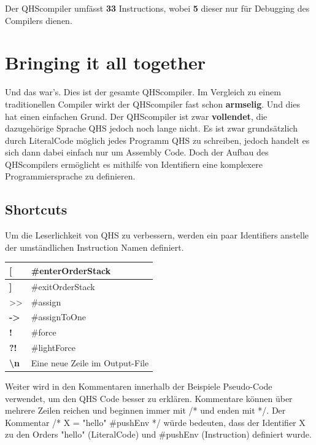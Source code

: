 Der QHScompiler umfässt \textbf{33} Instructions, wobei \textbf{5} dieser nur für Debugging des Compilers dienen.

\section{Bringing it all together} \label{sec:qhs-bringing-it-together}
Und das war's. Dies ist der gesamte QHScompiler. Im Vergleich zu einem traditionellen Compiler wirkt der QHScompiler fast schon \textbf{armselig}. Und dies hat einen einfachen Grund. Der QHScompiler ist zwar \textbf{vollendet},
die dazugehörige Sprache QHS jedoch noch lange nicht. Es ist zwar grundsätzlich durch LiteralCode möglich jedes Programm QHS zu schreiben, jedoch handelt es sich dann dabei einfach nur um Assembly Code.
Doch der Aufbau des QHScompilers ermöglicht es mithilfe von Identifiern eine komplexere Programmiersprache zu definieren.

\subsection{Shortcuts}
Um die Leserlichkeit von QHS zu verbessern, werden ein paar Identifiers anstelle der umständlichen Instruction Namen definiert.

\begin{table}[H]
    \centering
    \begin{tabular}{l|l}
    \textbf{{[}}                 & \#enterOrderStack              \\ \hline
    \textbf{{]}}                 & \#exitOrderStack               \\ \hline
    \textgreater{}\textgreater{} & \#assign                       \\ \hline
    \textbf{-\textgreater{}}     & \#assignToOne                  \\ \hline
    \textbf{!}                   & \#force                        \\ \hline
    \textbf{?!}                  & \#lightForce                   \\ \hline
    \textbf{\textbackslash{}n}   & Eine neue Zeile im Output-File
    \end{tabular}
\end{table}

Weiter wird in den Kommentaren innerhalb der Beispiele Pseudo-Code verwendet, um den QHS Code besser zu erklären. Kommentare können über mehrere Zeilen reichen und beginnen immer mit /* und enden mit */.
Der Kommentar /* X = "hello" \#pushEnv */ würde bedeuten, dass der Identifier X zu den Orders "hello" (LiteralCode) und \#pushEnv (Instruction) definiert wurde. 

